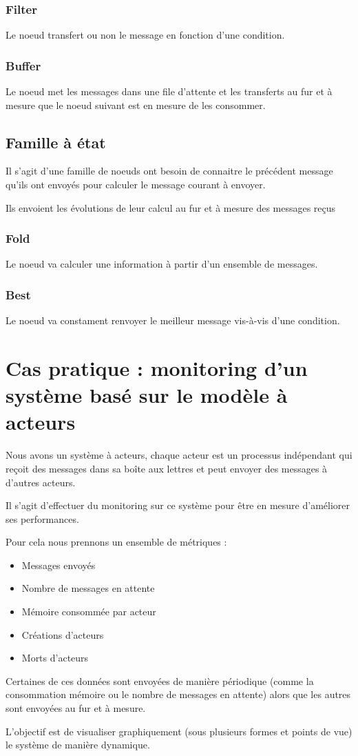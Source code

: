 \documentclass{article}
\begin{document}
\subsubsection{Filter}
Le noeud transfert ou non le message en fonction d'une condition.

\subsubsection{Buffer}
Le noeud met les messages dans une file d'attente et les transferts au fur et à
mesure que le noeud suivant est en mesure de les consommer.

\subsection{Famille à état}
Il s'agit d'une famille de noeuds ont besoin de connaitre le précédent message qu'ils
ont envoyés pour calculer le message courant à envoyer.

Ils envoient les évolutions de leur calcul au fur et à mesure des messages reçus

\subsubsection{Fold}
Le noeud va calculer une information à partir d'un ensemble de messages.

\subsubsection{Best}
Le noeud va constament renvoyer le meilleur message vis-à-vis d'une condition.

\section{Cas pratique : monitoring d'un système basé sur le modèle à acteurs}
Nous avons un système à acteurs, chaque acteur est un processus indépendant qui
reçoit des messages dans sa boîte aux lettres et peut envoyer des messages à d'autres
acteurs.

Il s'agit d'effectuer du monitoring sur ce système pour être en mesure d'améliorer
ses performances.

Pour cela nous prennons un ensemble de métriques :
\begin{itemize}
    \item Messages envoyés
    \item Nombre de messages en attente
    \item Mémoire consommée par acteur
    \item Créations d'acteurs
    \item Morts d'acteurs
\end{itemize}

Certaines de ces données sont envoyées de manière périodique (comme la consommation
mémoire ou le nombre de messages en attente) alors que les autres sont envoyées au
fur et à mesure.

L'objectif est de visualiser graphiquement (sous plusieurs formes et points de vue)
le système de manière dynamique.
\end{document}
